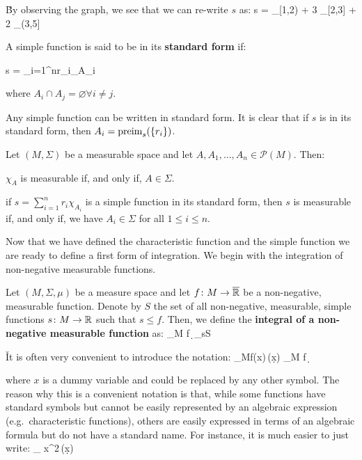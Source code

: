 \v

By observing the graph, we see that we can re-write $s$ as:
\bse
s = \chi_{[1,2)} + 3 \chi_{[2,3]} + 2 \chi_{(3,5]}
\ese
\ee

A simple function is said to be in its \textbf{standard form} if:

\vspace{-5pt}

\bse
s = \sum_{i=1}^nr_i\chi_{A_i}
\ese

where $A_i \cap A_j = \varnothing \forall i\neq j$.
\ed

Any simple function can be written in standard form. It is clear that if $s$ is in its standard form, then $A_i =
\operatorname{preim}_s(\{r_i\})$.

\bt[]
Let $(M,\Sigma)$ be a measurable space and let $A,A_1,\ldots, A_n\in\mathscr{P}(M)$. Then:
\ben[label=(\roman*)]
\item $\chi_A$ is measurable if, and only if, $A\in\Sigma$.
\item if $s=\sum_{i=1}^n r_i \chi_{A_i}$ is a simple function in its standard form, then $s$ is measurable if, and
only if, we have $A_i\in \Sigma$ for all $1\leq i\leq n$.
\een
\et

Now that we have defined the characteristic function and the simple function we are ready to define a first form of
integration. We begin with the integration of non-negative measurable functions.

Let $(M,\Sigma,\mu)$ be a measure space and let $f\colon M\to\overline{\mathbb{R}}$ be a non-negative, measurable function.
Denote by $S$ the set of all non-negative, measurable, simple functions $s\colon M \to \mathbb{R}$ such that $s\leq f$. Then, we
define the \textbf{integral of a non-negative measurable function} as:
\bse
\int_M\! f\, \d \mu \coloneqq \sup_{s\in S} \left[ \sum_{i=1}^nr_i \mu (A_i) \right]
\ese
\ed

\v

It is often very convenient to introduce the notation:
\bse
\int_M\!f(x)\,\mu(\d x) \equiv \int_M\! f\, \d \mu
\ese

where $x$ is a dummy variable and could be replaced by any other symbol. The reason why this is a convenient notation
is that, while some functions have standard symbols but cannot be easily represented by an algebraic expression (e.g.\
characteristic functions), others are easily expressed in terms of an algebraic formula but do not have a standard
name. For instance, it is much easier to just write:
\bse
\int_{\R} x^2\,\mu(\d x)
\ese

